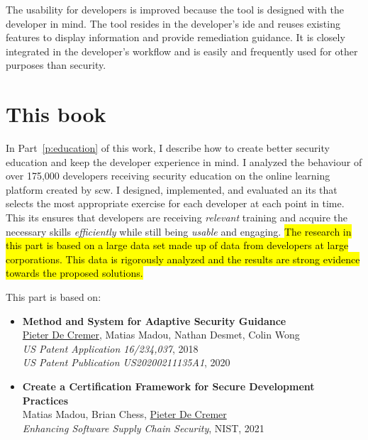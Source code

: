 The usability for developers is improved because the tool is designed with the developer in mind.  
The tool resides in the developer's \gls{ide} and reuses existing features to display information and provide remediation guidance.
It is closely integrated in the developer's workflow and is easily and frequently used for other purposes than security.

\section{This book}

In Part~\ref{p:education} of this work, I describe how to create better security education and keep the developer experience in mind.
I analyzed the behaviour of over 175,000 developers receiving security education on the online learning platform created by \gls{scw}. 
I designed, implemented, and evaluated an \gls{its} that selects the most appropriate exercise for each developer at each point in time.
This \gls{its} ensures that developers are receiving \textit{relevant} training and acquire the necessary skills \textit{efficiently} while still being \textit{usable} and engaging.
\hl{The research in this part is based on a large data set made up of data from developers at large corporations.
This data is rigorously analyzed and the results are strong evidence towards the proposed solutions.}

This part is based on:

\begin{itemize}
    \item 
    \textbf{Method and System for Adaptive Security Guidance}\\
    \underline{Pieter De Cremer}, Matias Madou, Nathan Desmet, Colin Wong\\
    \emph{US Patent Application 16/234,037}, 2018\\
    \emph{US Patent Publication US20200211135A1}, 2020
    \item 
    \textbf{Create a Certification Framework for Secure Development Practices}\\
    Matias Madou, Brian Chess, \underline{Pieter De Cremer}\\
    \emph{Enhancing Software Supply Chain Security}, NIST, 2021
\end{itemize}

